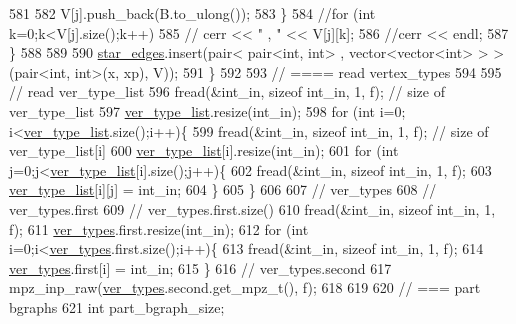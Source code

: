 \begin{DoxyCode}
581 
582         V[j].push\_back(B.to\_ulong());
583       \}
584       \textcolor{comment}{//for (int k=0;k<V[j].size();k++)}
585       \textcolor{comment}{//  cerr << " , " << V[j][k];}
586       \textcolor{comment}{//cerr << endl;}
587     \}
588 
589 
590     \hyperlink{classmarked__graph__compressed_a7df5779d313486644132bd816937f532}{star\_edges}.insert(pair< pair<int, int> , vector<vector<int> > > (pair<int, int>(x, xp), V));
591   \}
592 
593   \textcolor{comment}{// ==== read vertex\_types}
594 
595   \textcolor{comment}{// read ver\_type\_list}
596   fread(&int\_in, \textcolor{keyword}{sizeof} int\_in, 1, f); \textcolor{comment}{// size of ver\_type\_list}
597   \hyperlink{classmarked__graph__compressed_af2e3e55223d436628a02758dfae88493}{ver\_type\_list}.resize(int\_in);
598   \textcolor{keywordflow}{for} (\textcolor{keywordtype}{int} i=0; i<\hyperlink{classmarked__graph__compressed_af2e3e55223d436628a02758dfae88493}{ver\_type\_list}.size();i++)\{
599     fread(&int\_in, \textcolor{keyword}{sizeof} int\_in, 1, f); \textcolor{comment}{// size of ver\_type\_list[i]}
600     \hyperlink{classmarked__graph__compressed_af2e3e55223d436628a02758dfae88493}{ver\_type\_list}[i].resize(int\_in);
601     \textcolor{keywordflow}{for} (\textcolor{keywordtype}{int} j=0;j<\hyperlink{classmarked__graph__compressed_af2e3e55223d436628a02758dfae88493}{ver\_type\_list}[i].size();j++)\{
602       fread(&int\_in, \textcolor{keyword}{sizeof} int\_in, 1, f);
603       \hyperlink{classmarked__graph__compressed_af2e3e55223d436628a02758dfae88493}{ver\_type\_list}[i][j] = int\_in;
604     \}
605   \}
606 
607   \textcolor{comment}{// ver\_types}
608   \textcolor{comment}{// ver\_types.first}
609   \textcolor{comment}{// ver\_types.first.size()}
610   fread(&int\_in, \textcolor{keyword}{sizeof} int\_in, 1, f);
611   \hyperlink{classmarked__graph__compressed_af446cc5e23c241a92b76642fd5ebc403}{ver\_types}.first.resize(int\_in);
612   \textcolor{keywordflow}{for} (\textcolor{keywordtype}{int} i=0;i<\hyperlink{classmarked__graph__compressed_af446cc5e23c241a92b76642fd5ebc403}{ver\_types}.first.size();i++)\{
613     fread(&int\_in, \textcolor{keyword}{sizeof} int\_in, 1, f);
614     \hyperlink{classmarked__graph__compressed_af446cc5e23c241a92b76642fd5ebc403}{ver\_types}.first[i] = int\_in;
615   \}
616   \textcolor{comment}{// ver\_types.second}
617   mpz\_inp\_raw(\hyperlink{classmarked__graph__compressed_af446cc5e23c241a92b76642fd5ebc403}{ver\_types}.second.get\_mpz\_t(), f);
618 
619 
620   \textcolor{comment}{// === part bgraphs}
621   \textcolor{keywordtype}{int} part\_bgraph\_size;

\end{DoxyCode}
